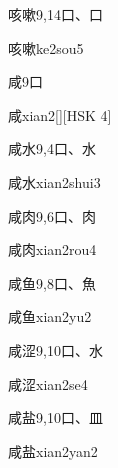 \begin{Entry}{咳嗽}{9,14}{⼝、⼝}
  \begin{Phonetics}{咳嗽}{ke2sou5}
  \end{Phonetics}
\end{Entry}

\begin{Entry}{咸}{9}{⼝}
  \begin{Phonetics}{咸}{xian2}[][HSK 4]
  \end{Phonetics}
\end{Entry}

\begin{Entry}{咸水}{9,4}{⼝、⽔}
  \begin{Phonetics}{咸水}{xian2shui3}
  \end{Phonetics}
\end{Entry}

\begin{Entry}{咸肉}{9,6}{⼝、⾁}
  \begin{Phonetics}{咸肉}{xian2rou4}
  \end{Phonetics}
\end{Entry}

\begin{Entry}{咸鱼}{9,8}{⼝、⿂}
  \begin{Phonetics}{咸鱼}{xian2yu2}
  \end{Phonetics}
\end{Entry}

\begin{Entry}{咸涩}{9,10}{⼝、⽔}
  \begin{Phonetics}{咸涩}{xian2se4}
  \end{Phonetics}
\end{Entry}

\begin{Entry}{咸盐}{9,10}{⼝、⽫}
  \begin{Phonetics}{咸盐}{xian2yan2}
  \end{Phonetics}
\end{Entry}

